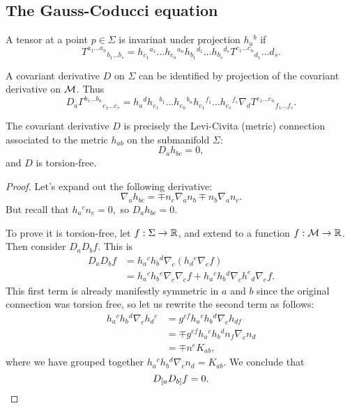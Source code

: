 \subsection*{The Gauss-Coducci equation} A tensor at a point $p\in \Sigma$ is invarinat under projection $h_a{}^b$ if
\begin{equation}
    T^{a_1\ldots a_n}{}_{b_1 \ldots b_s}= h_{c_1}{}^{a_1}\ldots h_{c_n}{}^{a_n} h_{b_1}{}^{d_1}\ldots h_{b_s}{}^{d_s}T^{c_1\ldots c_n}{}_{d_1}\ldots {d_s}.
\end{equation}
\begin{prop}
A covariant derivative $D$ on $\Sigma$ can be identified by projection of the covariant derivative on $\mathcal{M}$. Thus
\begin{equation}
    D_a \Gamma^{b_1 \ldots b_n}{}_{c_1\ldots c_s}=h_a{}^d h_{e_1}{}^{b_1} \ldots h_{e_n}{}^{b_n} h_{c_1}{}^{f_1} \ldots h_{c_s}{}^{f_s} \nabla_d T^{e_1 \ldots e_n}{}_{f_1\ldots f_s}.
    \end{equation}
\end{prop}
\begin{lem}
    The covariant derivative $D$ is precisely the Levi-Civita (metric) connection associated to the metric $h_{ab}$ on the submanifold $\Sigma$:
    \begin{equation}
        D_a h_{bc}=0,
    \end{equation}
    and $D$ is torsion-free.
\end{lem}
\begin{proof}
    Let's expand out the following derivative:
    \begin{equation}
        \nabla_a h_{bc}=\mp n_c \nabla_a n_b \mp n_b \nabla_a n_c.
    \end{equation}
    But recall that $h_a{}^c n_c =0,$ so $D_a h_{bc}=0$.
    
    To prove it is torsion-free, let $f:\Sigma \to \mathbb{R}$, and extend to a function $f:\mathcal{M} \to \mathbb{R}$. Then consider $D_a D_b f$. This is
    \begin{align*}
        D_a D_b f &= h_a{}^c h_b{}^d \nabla_c(h_d{}^e \nabla_e f)\\
        &= h_a{}^c h_b{}^e \nabla_c \nabla_e f + h_a{}^c h_b{}^d \nabla_c h^e{}_d \nabla_e f.
    \end{align*}
    This first term is already manifestly symmetric in $a$ and $b$ since the original connection was torsion free, so let us rewrite the second term as follows:
    \begin{align*}
        h_a{}^c h_b{}^d \nabla_c h_d{}^e 
            &= g^{ef} h_a{}^c h_b{}^d \nabla_c h_{df}\\
            &= \mp g^{ef}h_a{}^c h_b{}^d n_f \nabla_c n_d\\
            &= \mp n^e K_{ab},
    \end{align*}
    where we have grouped together $h_a{}^c h_b{}^d \nabla_c n_d =K_{ab}$. We conclude that
    \begin{equation}
        D_{[a}D_{b]} f=0.\qedhere
    \end{equation}
\end{proof}

